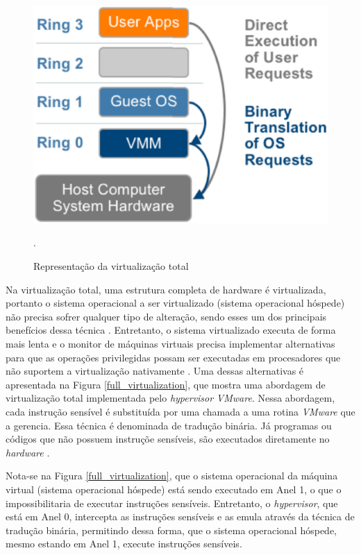\begin{figure}[!htb]
\centering
\includegraphics [keepaspectratio=true,scale=0.4]{figuras/rings.eps}
\caption{Representação da virtualização total}
\cite{vmware}.
\label{rings}
\end{figure}


Na virtualização total, uma estrutura completa de hardware é virtualizada, portanto o sistema operacional a ser virtualizado (sistema operacional hóspede) não precisa sofrer qualquer tipo de alteração, sendo esses um dos principais benefícios dessa técnica \cite{marcos}. Entretanto, o sistema virtualizado executa de forma mais lenta e o monitor de máquinas virtuais precisa implementar alternativas para que as operações privilegidas possam ser executadas em procesadores que não suportem a virtualização nativamente \cite{marcos}. Uma dessas alternativas é apresentada na Figura \ref{full_virtualization}, que mostra uma abordagem de virtualização total implementada pelo \textit{hypervisor} \textit{VMware}. Nessa abordagem, cada instrução sensível é substituída por uma chamada a uma rotina \textit{VMware} que a gerencia. Essa técnica é denominada de tradução binária. Já programas ou códigos que não possuem instruçõe sensíveis, são executados diretamente no \textit{hardware} \cite{tanembaum}.

Nota-se na Figura \ref{full_virtualization}, que o sistema operacional da máquina virtual (sistema operacional hóspede) está sendo executado em Anel 1, o que o impossibilitaria de executar instruções sensíveis. Entretanto, o \textit{hypervisor}, que está em Anel 0, intercepta as instruções sensíveis e as emula através da técnica de tradução binária, permitindo dessa forma, que o sistema operacional hóspede, mesmo estando em Anel 1, execute instruções sensíveis.

